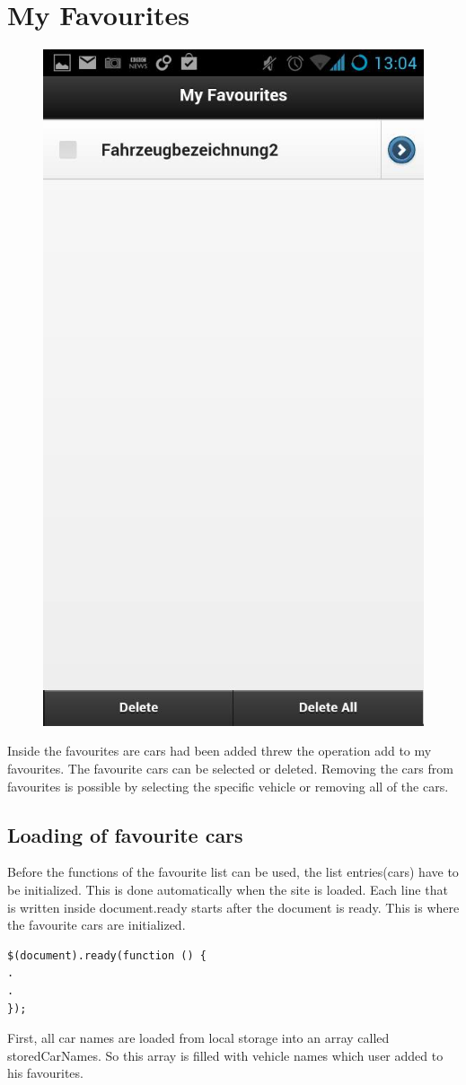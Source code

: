 \section{My Favourites}
\begin{figure}[h]
\centering
\includegraphics[width=0.4\linewidth]{graphics/chapter4/15}
\caption{}
\label{fig:16}
\end{figure}

Inside the favourites are cars had been added threw the operation add to my favourites. The favourite cars can be selected or deleted. Removing the cars from favourites is possible by selecting the specific vehicle or removing all of the cars.
\\

\subsection{Loading of favourite cars}
Before the functions of the favourite list can be used, the list entries(cars) have to be initialized. This is done automatically when the site is loaded. Each line that is written inside document.ready starts after the document is ready. This is where the favourite cars are initialized.
\\
\begin{lstlisting}[language=html, caption= 
start timer function,captionpos=b]
$(document).ready(function () {
.
.
});
\end{lstlisting}

First, all car names are loaded from local storage into an array called storedCarNames. So this array is filled with vehicle names which user added to his favourites. 
\\

